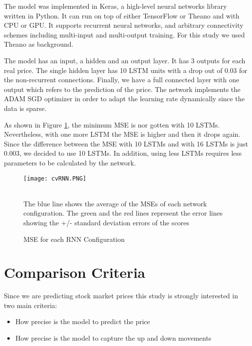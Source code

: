 The model was implemented in Keras, a high-level neural networks library written in Python. It can run on top of either TensorFlow or Theano and with CPU or GPU. It supports recurrent neural networks, and arbitrary connectivity schemes including multi-input and multi-output training. For this study we used Theano as background.

The model has an input, a hidden and an output layer. It has 3 outputs for each real price. The single hidden layer has 10 LSTM units with a drop out of 0.03 for the non-recurrent connections. Finally, we have a full connected layer with one output which refers to the prediction of the price. The network implements the  ADAM SGD optimizer in order to adapt the learning rate dynamically since the data is sparse. 

As shown in Figure \ref{fig:cvRNN}, the minimum MSE is nor gotten with 10 LSTMs. Nevertheless, with one more LSTM the MSE is higher and then it drops again. Since the difference between the MSE with 10 LSTMs and with 16 LSTMs is just 0.003, we decided to use 10 LSTMs. In addition, using less LSTMs requires less parameters to be calculated by the network.  

\begin{figure}[h]
\centering
\texttt{[image: cvRNN.PNG]}
\caption{MSE for each RNN Configuration}
\begin{minipage}{12cm}
    \footnotesize
    \emph \\ The blue line shows the average of the MSEs of each network configuration. The green and the red lines represent the error lines showing the +/- standard deviation errors of the scores
    \end{minipage}
\label{fig:cvRNN}
\end{figure}

\section{Comparison Criteria}

Since we are predicting stock market prices this study is strongly interested in two main criteria:

\begin{itemize}
\item How precise is the model to predict the price
\item How precise is the model to capture the up and down movements
\end{itemize}

